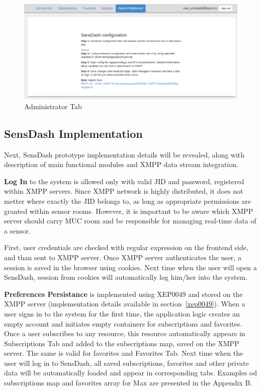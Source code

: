 \begin{figure}[!ht]
\centering
\includegraphics[scale=0.6]{Screenshots/UseCaseReferences.png}   
\caption[Administrator Tab]{Administrator Tab}
\label{img:admin}                         
\end{figure}

\subsection{SensDash Implementation}
Next, SensDash prototype implementation details will be revealed, along with description of main functional modules and XMPP data stream integration.

\textbf{Log In} to the system is allowed only with valid JID and password, registered within XMPP servers. Since XMPP network is highly distributed, it does not metter where exactly the JID belongs to, as long as appropriate permissions are granted within sensor rooms. However, it is important to be aware which XMPP server should carry MUC  room and be responsible for managing real-time data of a sensor.

First, user credentials are checked with regular expression on the frontend side, and than sent to XMPP server. Once XMPP server authenticates the user, a session is saved in the browser using cookies. Next time when the user will open a SensDash, session from cookies will automatically log him/her into the system. 

\textbf{Preferences Persistance} is implemented using XEP0049 and stored on the XMPP server (implementation details available in section~\ref{xep0049}). When a user signs in to the system for the first time, the application logic creates an empty account and initiates empty containers for subscriptions and favorites. Once a user subscribes to any resource, this resource automatically appears in Subscriptions Tab and added to the subscriptions map, saved on the XMPP server. The same is valid for favorites and Favorites Tab. Next time when the user will log in to SensDash, all saved subscriptions, favorites and other private data will be automatically loaded and appear in corresponding tabs. Examples od subscriptions map and favorites array for Max are presented in the Appendix B.

